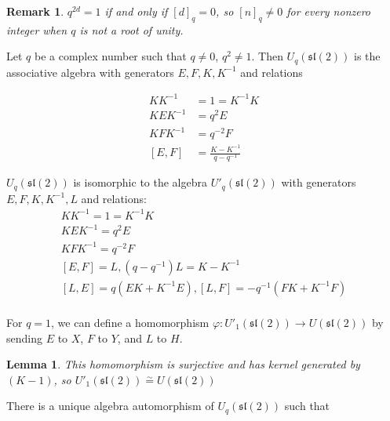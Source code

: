 \documentclass[]{article}
\newtheorem{remark}{Remark}
\newtheorem{lemma}{Lemma}
\begin{document}
\begin{remark}
$q^{2d}=1$ if and only if $[d]_q = 0$, so $[n]_q \neq 0$ for every nonzero integer when $q$ is not a root of unity. 
\end{remark}

Let $q$ be a complex number such that $q \neq 0$, $q^2 \neq 1$.  Then $U_q(\mathfrak{sl}(2))$ is the associative algebra with generators $E,F,K, K^{-1}$ and relations 

\begin{align}
    KK^{-1} &= 1 = K^{-1}K \\
    KEK^{-1} &= q^2 E \\
    KFK^{-1} &= q^{-2} F \\
    [E,F] &= \frac{K - K^{-1}}{q - q^{-1}}
\end{align}


$U_q(\mathfrak{sl}(2))$ is isomorphic to the algebra $U'_q(\mathfrak{sl}(2))$ with generators $E,F,K,K^{-1},L$ and relations:
\begin{equation}
    \begin{gathered}
    KK^{-1} = 1 = K^{-1}K \\
    KEK^{-1} = q^2 E \\
    KFK^{-1} = q^{-2} F \\
    [E,F] = L, (q - q^{-1})L = K-K^{-1} \\
    [L,E] = q(EK + K^{-1}E), [L,F] = -q^{-1}(FK + K^{-1}F) \\
    \end{gathered}
\end{equation}



For $q=1$, we can define a homomorphism $\varphi: U'_1(\mathfrak{sl}(2)) \to
U(\mathfrak{sl}(2))$ by sending $E$ to $X$, $F$ to $Y$, and $L$ to $H$. 
\begin{lemma}
This homomorphism is surjective and has kernel generated by $(K-1)$, so
$U'_1(\mathfrak{sl}(2)) \stackrel{\sim}{=} U(\mathfrak{sl}(2))$
\end{lemma}
There is a unique algebra automorphism of $U_q(\mathfrak{sl}(2))$ such that 
\end{document}
